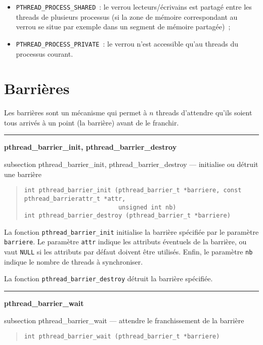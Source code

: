 \documentclass [twoside] {report}
\newcommand {\primitive} [1]
    {
	\phantomsection
	{\large \textbf {#1}}
	\addcontentsline {toc} {subsection} {#1}
    }
\newcommand {\separation}
    {
	\vspace {5mm}
	\nopagebreak
	\hrule
    }
\begin{document}
\begin {itemize}
    \item \verb|PTHREAD_PROCESS_SHARED|~: le verrou lecteurs/écrivains
	est partagé entre les threads de plusieurs processus (si la zone
	de mémoire correspondant au verrou se situe par exemple dans un
	segment de mémoire partagée)~;
    \item \verb|PTHREAD_PROCESS_PRIVATE|~: le verrou n'est accessible
	qu'au threads du processus courant.
\end {itemize}


\section {Barrières}

Les barrières sont un mécanisme qui permet à $n$ threads d'attendre
qu'ils soient tous arrivés à un point (la barrière) avant de le
franchir.

\separation
\primitive {pthread\_barrier\_init, pthread\_barrier\_destroy} --- initialise ou détruit une barrière

\begin {quote}
\begin {verbatim}
int pthread_barrier_init (pthread_barrier_t *barriere, const pthread_barrierattr_t *attr,
                          unsigned int nb)
int pthread_barrier_destroy (pthread_barrier_t *barriere)
\end{verbatim}
\end {quote}

La fonction \verb|pthread_barrier_init| initialise la barrière
spécifiée par le paramètre \texttt {barriere}.  Le paramètre \texttt
{attr} indique les attributs éventuels de la barrière, ou vaut \texttt
{NULL} si les attributs par défaut doivent être utilisés. Enfin,
le paramètre \texttt {nb} indique le nombre de threads à synchroniser.

La fonction \verb|pthread_barrier_destroy| détruit la barrière spécifiée.


\separation
\primitive {pthread\_barrier\_wait} --- attendre le franchissement de la barrière

\begin {quote}
\begin {verbatim}
int pthread_barrier_wait (pthread_barrier_t *barriere)
\end{verbatim}
\end {quote}
\end{document}
